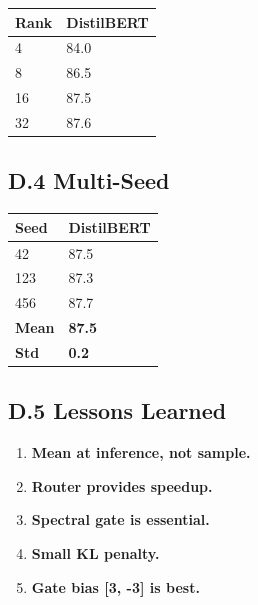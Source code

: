 \begin{table}[H]
\centering
\small
\begin{tabular}{ll}
\toprule
\textbf{Rank} & \textbf{DistilBERT} \\
\midrule
4 & 84.0 \\
8 & 86.5 \\
16 & 87.5 \\
32 & 87.6 \\
\bottomrule
\end{tabular}
\end{table}

\subsection{D.4 Multi-Seed}

\begin{table}[H]
\centering
\small
\begin{tabular}{ll}
\toprule
\textbf{Seed} & \textbf{DistilBERT} \\
\midrule
42 & 87.5 \\
123 & 87.3 \\
456 & 87.7 \\
\textbf{Mean} & \textbf{87.5} \\
\textbf{Std} & \textbf{0.2} \\
\bottomrule
\end{tabular}
\end{table}

\subsection{D.5 Lessons Learned}

\begin{enumerate}
\item \textbf{Mean at inference, not sample.}
\item \textbf{Router provides speedup.}
\item \textbf{Spectral gate is essential.}
\item \textbf{Small KL penalty.}
\item \textbf{Gate bias [3, -3] is best.}

\end{enumerate}
